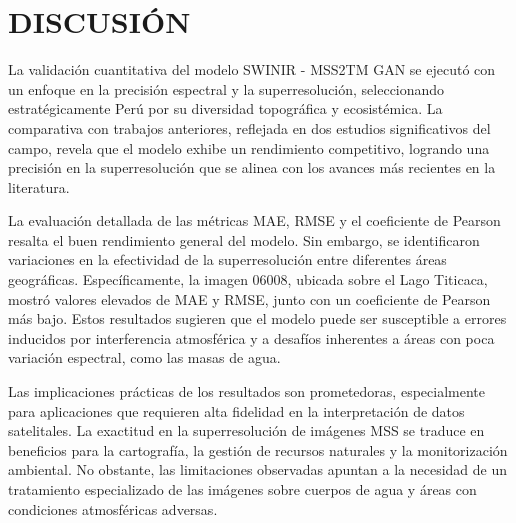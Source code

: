 
\chapter{DISCUSIÓN}
    La validación cuantitativa del modelo SWINIR - MSS2TM GAN se ejecutó con un enfoque en la precisión espectral y la superresolución, seleccionando estratégicamente Perú por su diversidad topográfica y ecosistémica. La comparativa con trabajos anteriores, reflejada en dos estudios significativos del campo, revela que el modelo exhibe un rendimiento competitivo, logrando una precisión en la superresolución que se alinea con los avances más recientes en la literatura.

    La evaluación detallada de las métricas MAE, RMSE y el coeficiente de Pearson resalta el buen rendimiento general del modelo. Sin embargo, se identificaron variaciones en la efectividad de la superresolución entre diferentes áreas geográficas. Específicamente, la imagen 06008, ubicada sobre el Lago Titicaca, mostró valores elevados de MAE y RMSE, junto con un coeficiente de Pearson más bajo. Estos resultados sugieren que el modelo puede ser susceptible a errores inducidos por interferencia atmosférica y a desafíos inherentes a áreas con poca variación espectral, como las masas de agua.

    Las implicaciones prácticas de los resultados son prometedoras, especialmente para aplicaciones que requieren alta fidelidad en la interpretación de datos satelitales. La exactitud en la superresolución de imágenes MSS se traduce en beneficios para la cartografía, la gestión de recursos naturales y la monitorización ambiental. No obstante, las limitaciones observadas apuntan a la necesidad de un tratamiento especializado de las imágenes sobre cuerpos de agua y áreas con condiciones atmosféricas adversas.